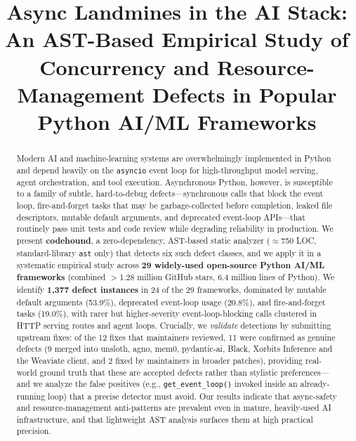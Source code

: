 \documentclass[conference]{IEEEtran}
\begin{document}
\title{Async Landmines in the AI Stack: An AST-Based Empirical Study of Concurrency and Resource-Management Defects in Popular Python AI/ML Frameworks}

\author{
}

\maketitle

\begin{abstract}
Modern AI and machine-learning systems are overwhelmingly implemented in Python and depend heavily on the \texttt{asyncio} event loop for high-throughput model serving, agent orchestration, and tool execution. Asynchronous Python, however, is susceptible to a family of subtle, hard-to-debug defects---synchronous calls that block the event loop, fire-and-forget tasks that may be garbage-collected before completion, leaked file descriptors, mutable default arguments, and deprecated event-loop APIs---that routinely pass unit tests and code review while degrading reliability in production. We present \textbf{codehound}, a zero-dependency, AST-based static analyzer ($\approx$750 LOC, standard-library \texttt{ast} only) that detects six such defect classes, and we apply it in a systematic empirical study across \textbf{29 widely-used open-source Python AI/ML frameworks} (combined $>$1.28 million GitHub stars, 6.4 million lines of Python). We identify \textbf{1{,}377 defect instances} in 24 of the 29 frameworks, dominated by mutable default arguments (53.9\%), deprecated event-loop usage (20.8\%), and fire-and-forget tasks (19.0\%), with rarer but higher-severity event-loop-blocking calls clustered in HTTP serving routes and agent loops. Crucially, we \emph{validate} detections by submitting upstream fixes: of the 12 fixes that maintainers reviewed, 11 were confirmed as genuine defects (9 merged into unsloth, agno, mem0, pydantic-ai, Black, Xorbits Inference and the Weaviate client, and 2 fixed by maintainers in broader patches), providing real-world ground truth that these are accepted defects rather than stylistic preferences---and we analyze the false positives (e.g., \texttt{get\_event\_loop()} invoked inside an already-running loop) that a precise detector must avoid. Our results indicate that async-safety and resource-management anti-patterns are prevalent even in mature, heavily-used AI infrastructure, and that lightweight AST analysis surfaces them at high practical precision.
\end{abstract}
\end{document}
